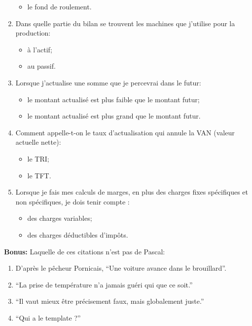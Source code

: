 \begin{enumerate}
\begin{itemize}
     \item le fond de roulement.
    \end{itemize}
  \item Dans quelle partie du bilan se trouvent les machines que j'utilise pour la production:
    \begin{itemize}
     \item à l'actif;
     \item au passif.
    \end{itemize}
  \item Lorsque j'actualise une somme que je percevrai dans le futur:
    \begin{itemize}
     \item le montant actualisé est plus faible que le montant futur;
     \item le montant actualisé est plus grand que le montant futur.
    \end{itemize}
  \item Comment appelle-t-on le taux d'actualisation qui annule la VAN (valeur actuelle nette):
    \begin{itemize}
     \item le TRI;
     \item le TFT.
    \end{itemize}
  \item Lorsque je fais mes calculs de marges, en plus des charges fixes spécifiques et non spécifiques, je dois tenir compte  :
    \begin{itemize}
     \item des charges variables;
     \item des charges déductibles d'impôts.
    \end{itemize}
\end{enumerate}

\textbf{Bonus:} Laquelle de ces citations n'est pas de Pascal:
\begin{enumerate}
  \item D'après le pêcheur Pornicais, ``Une voiture avance dans le brouillard''.
  \item ``La prise de température n'a jamais guéri qui que ce soit.''
  \item ``Il vaut mieux être précisement faux, mais globalement juste.''
  \item ``Qui a le template ?''
\end{enumerate}

\endgroup